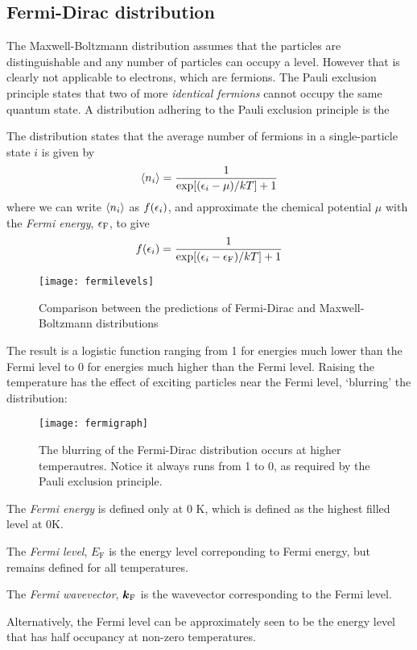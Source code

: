 \subsection{Fermi-Dirac distribution}
The Maxwell-Boltzmann distribution assumes that the particles are distinguishable and any number of particles can occupy a level. However that is clearly not applicable to electrons, which are fermions. The Pauli exclusion principle states that two of more \emph{identical fermions} cannot occupy the same quantum state. A distribution adhering to the Pauli exclusion principle is the 
\begin{thrm}
The distribution states that the average number of fermions in a single-particle state $i$ is given by
\begin{equation}
	\langle n_i\rangle=\frac{1}{\exp[(\epsilon_i-\mu)/kT]+1}
\end{equation}
where we can write $\langle n_i\rangle$ as $f(\epsilon_i)$, and approximate the chemical potential $\mu$ with the \emph{Fermi energy}, $\epsilon_{\mathrm{F}}$, to give
\begin{equation}
	f(\epsilon_i)=\frac{1}{\exp[(\epsilon_i-\epsilon_{\mathrm{F}})/kT]+1}
\end{equation}
\end{thrm}
\begin{figure}[ht]
	\centering
	\texttt{[image: fermilevels]}
	\caption{Comparison between the predictions of Fermi-Dirac and Maxwell-Boltzmann distributions}
	\label{fig:fermilevels}
\end{figure}
The result is a logistic function ranging from 1 for energies much lower than the Fermi level to 0 for energies much higher than the Fermi level. Raising the temperature has the effect of exciting particles near the Fermi level, `blurring' the distribution:
\begin{figure}[ht]
	\centering
	\texttt{[image: fermigraph]}
	\caption{The blurring of the Fermi-Dirac distribution occurs at higher temperautres. Notice it always runs from 1 to 0, as required by the Pauli exclusion principle.}
	\label{fig:fermigraph}
\end{figure}
\begin{defi}
The \emph{Fermi energy} is defined only at 0 K, which is defined as the highest filled level at 0K.\par
The \emph{Fermi level}, $E_{\mathrm{F}}$ is the energy level correponding to Fermi energy, but remains defined for all temperatures.\par
The \emph{Fermi wavevector}, $\boldsymbol{k}_{\mathrm{F}}$ is the wavevector corresponding to the Fermi level.\par
Alternatively, the Fermi level can be approximately seen to be the energy level that has half occupancy at non-zero temperatures.
\end{defi}
